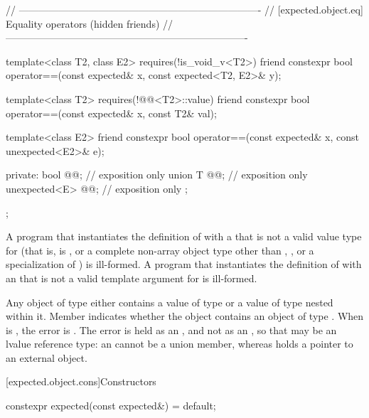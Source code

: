 \begin{codeblock}
{  // -------------------------------------------------------------------------
  // [expected.object.eq] Equality operators (hidden friends)
  // -------------------------------------------------------------------------

  template<class T2, class E2>
    requires(!is_void_v<T2>)
  friend constexpr bool operator==(const expected& x, const expected<T2, E2>& y);

  template<class T2>
    requires(!@@<T2>::value)
  friend constexpr bool operator==(const expected& x, const T2& val);

  template<class E2>
  friend constexpr bool operator==(const expected& x, const unexpected<E2>& e);

private:
  bool @@; // exposition only
  union {
    T @@;              // exposition only
    unexpected<E> @@; // exposition only
  };
};
\end{codeblock}

\begin{itemdescr}
\pnum
\mandates
A program that instantiates the definition of  with a  that is not a valid value type for  (that is,  is , or a complete non-array object type other than , , or a specialization of ) is ill-formed. A program that instantiates the definition of  with an  that is not a valid template argument for  is ill-formed.

\pnum
\remarks
Any object of type  either contains a value of type  or a value of type  nested within it. Member  indicates whether the  object contains an object of type . When  is , the error is . The error is held as an , and not as an , so that  may be an lvalue reference type: an  cannot be a union member, whereas  holds a pointer to an external object.
\end{itemdescr}

[expected.object.cons]{Constructors}

%
\begin{itemdecl}
constexpr expected(const expected&) = default;
\end{itemdecl}

